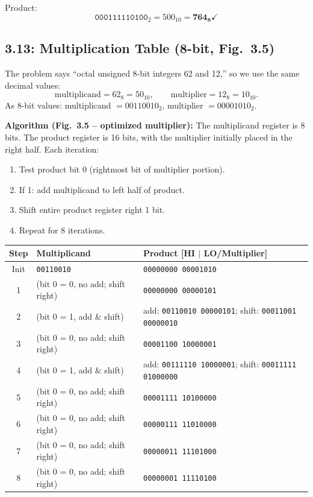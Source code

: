 Product:
\[
  \texttt{000111110100}_2 = 500_{10} = \mathbf{764_8} \checkmark
\]

\subsection*{3.13: Multiplication Table (8-bit, Fig.~3.5)}
\hypertarget{sol-3.13}{}

The problem says ``octal unsigned 8-bit integers 62 and 12,'' so we use the same
decimal values:
\[
  \text{multiplicand} = 62_8 = 50_{10}, \qquad
  \text{multiplier} = 12_8 = 10_{10}.
\]
As 8-bit values: multiplicand $= 00110010_2$, multiplier $= 00001010_2$.

\medskip\noindent\textbf{Algorithm (Fig.~3.5 -- optimized multiplier):}
The multiplicand register is 8 bits. The product register is 16 bits, with the
multiplier initially placed in the right half. Each iteration:
\begin{enumerate}
  \item Test product bit 0 (rightmost bit of multiplier portion).
  \item If 1: add multiplicand to left half of product.
  \item Shift entire product register right 1 bit.
  \item Repeat for 8 iterations.
\end{enumerate}

\begin{center}
\begin{tabular}{cll}
\toprule
\textbf{Step} & \textbf{Multiplicand} & \textbf{Product [HI $|$ LO/Multiplier]} \\
\midrule
Init & \texttt{00110010} & \texttt{00000000\,00001010} \\
1 & (bit 0 = 0, no add; shift right) & \texttt{00000000\,00000101} \\
2 & (bit 0 = 1, add \& shift) & add: \texttt{00110010\,00000101}; shift: \texttt{00011001\,00000010} \\
3 & (bit 0 = 0, no add; shift right) & \texttt{00001100\,10000001} \\
4 & (bit 0 = 1, add \& shift) & add: \texttt{00111110\,10000001}; shift: \texttt{00011111\,01000000} \\
5 & (bit 0 = 0, no add; shift right) & \texttt{00001111\,10100000} \\
6 & (bit 0 = 0, no add; shift right) & \texttt{00000111\,11010000} \\
7 & (bit 0 = 0, no add; shift right) & \texttt{00000011\,11101000} \\
8 & (bit 0 = 0, no add; shift right) & \texttt{00000001\,11110100} \\
\bottomrule
\end{tabular}
\end{center}


